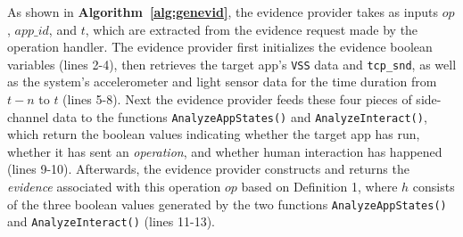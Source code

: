 \documentclass[letterpaper,12pt]{article}
\begin{document}
As shown in {\bf Algorithm~\ref{alg:genevid}}, the evidence provider takes as inputs $op$, $app\_id$, and $t$, which are extracted from the evidence request made by the operation handler. 
The evidence provider first initializes the evidence boolean variables  (lines 2-4), then retrieves the target app's \texttt{VSS} data and \texttt{tcp\_snd}, as well as the system's accelerometer and light sensor data for the time duration from $t-n$ to $t$ (lines 5-8). Next the evidence provider feeds these four pieces of side-channel data to the functions \texttt{AnalyzeAppStates()} and \texttt{AnalyzeInteract()}, which return the boolean values indicating whether the target app has run, whether it has sent an \textit{operation}, and whether human interaction has happened (lines 9-10). Afterwards, the evidence provider constructs and returns the \textit{evidence} associated with this operation $op$ based on Definition 1, where $h$ consists of the three boolean values generated by the two functions \texttt{AnalyzeAppStates()} and \texttt{AnalyzeInteract()} (lines 11-13). %
\end{document}
